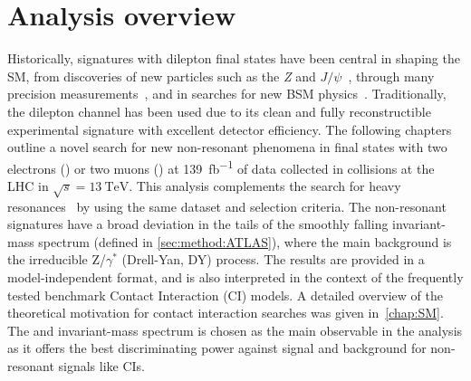 \chapter*{Analysis overview}\label{chap:analyintro}


Historically, signatures with dilepton final states have been central in shaping the SM, from discoveries of new particles such as the \emph{Z} and $J/\psi$~\cite{PhysRevLett.33.1404, PhysRevLett.33.1406,1977PhRvL..39..252H,1983398,BAGNAIA1983130}, through many precision measurements~\cite{ALEPH:2005ab,Aad:2016zzw,Aad:2016izn,Sirunyan:2018swq}, and in searches for new BSM physics~\cite{Aad:2019fac,Sirunyan:2018exx,Sirunyan:2018ipj,EXOT-2016-05}. Traditionally, the dilepton channel has been used due to its clean and fully reconstructible experimental signature with excellent detector efficiency. The following chapters outline a novel search for new non-resonant phenomena in final states with two electrons (\ee) or two muons (\mumu) at \SI{139}{\femto\barn^{-1}} of data collected in \protonproton collisions at the LHC in $\sqrt{s}=\SI{13}{\tera\electronvolt}$. This analysis complements the search for heavy resonances~\cite{Aad:2019fac} by using the same dataset and selection criteria. The non-resonant signatures have a broad deviation in the tails of the smoothly falling invariant-mass spectrum (defined in \cref{sec:method:ATLAS}), where the main background is the irreducible Z/$\gamma^*$ (Drell-Yan, DY) process. The results are provided in a model-independent format, and is also interpreted in the context of the frequently tested benchmark Contact Interaction (CI) models. A detailed overview of the theoretical motivation for contact interaction searches was given in~\cref{chap:SM}. The \ee and \mumu invariant-mass spectrum is chosen as the main observable in the analysis as it offers the best discriminating power against signal and background for non-resonant signals like CIs. 

